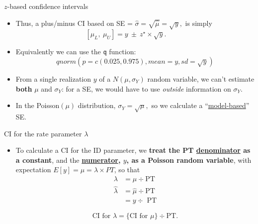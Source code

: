 \documentclass{beamer}\usepackage[]{graphicx}\usepackage[]{color}
\begin{document}
\begin{frame}{$z$-based confidence intervals}
\begin{itemize}
	\setlength\itemsep{1.1em}
	\item Thus, a plus/minus CI based on SE = $\hat{\sigma} =  \sqrt{\hat{\mu}} = \sqrt{y},$   is simply
	$$[ \mu_{L}, \ \mu_{U}] = y  \ \pm \ z^\star \times \sqrt{y}. \ \ \ \ \ \ \ \ \ \ \ \  $$
	\item Equivalently we can use the \texttt{q} function: $$qnorm(p = c(0.025, 0.975), mean = y, sd = \sqrt{y})$$
	\pause 
	
	\vspace*{-0.7cm}
	
	\item From a single realization $y$ of a $N(\mu,\sigma_{Y})$ random variable, we can't estimate \textbf{both} $\mu$ and $\sigma_{Y}$: for a SE, we would have to use \textit{outside} information on $\sigma_{Y}$.  
	
	\pause 
	
	\item In the  Poisson$(\mu)$ distribution, $\sigma_{Y} = \sqrt{\mu},$ so we  calculate a ``\underline{model-based}'' SE.
	
	
\end{itemize}

\end{frame}

\begin{frame}{CI for the rate  parameter $\lambda$}

\begin{itemize}
	\item To calculate a CI for the ID parameter, we \textbf{treat the PT \underline{denominator} as a constant}, and the \textbf{\underline{numerator}, $y$,  as a Poisson random variable}, with expectation $E[y] = \mu = \lambda \times PT$, so that
	\begin{align*}
	\lambda &= \mu \div \textrm{PT}\\
	\hat{\lambda} &= \hat{\mu} \div \textrm{PT} \\
	& = y\div\textrm{ PT}
	\end{align*}
	
	
	
	\vspace*{0.3in}
	\begin{equation}
	\boxed{\textrm{CI for }\lambda = \{\textrm{CI for }\mu\} \div \textrm{PT}.}
	\end{equation}
	
	
\end{itemize}
\end{frame}
\end{document}
